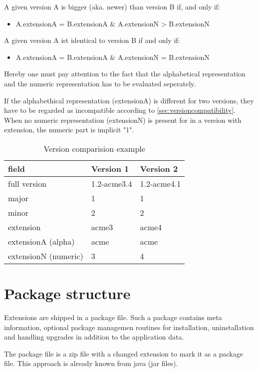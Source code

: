 A given version A is bigger (aka. newer) than version B if, and only if:
\begin{itemize}
\item A.extensionA = B.extensionA \& A.extensionN > B.extensionN
\end{itemize}

A given version A ist identical to version B if and only if:
\begin{itemize}
\item A.extensionA = B.extensionA \& A.extensionN = B.extensionN
\end{itemize}

Hereby one must pay attention to the fact that the alphabetical representation and the numeric representation has to be evaluated seperately.

If the alphabethical representation (extensionA) is different for two versions, they have to be regarded as incompatible according to \ref{sec:versioncompatibility}. When no numeric representation (extensionN) is present for in a version with extension, the numeric part is implicit "1".

\small
\begin{longtable}{|p{}|p{}|p{}|}
\caption{Version comparision example} \\
\hline
\label{tab:versioncompareexamples}
\textbf{field} & \textbf{Version 1} & \textbf{Version 2} \\
\hline
full version & 1.2-acme3.4 & 1.2-acme4.1
\\ \hline
major & 1 & 1
\\ \hline
minor & 2 & 2
\\ \hline
extension & acme3 & acme4
\\ \hline
extensionA (alpha) & acme & acme
\\ \hline
extensionN (numeric) & 3 & 4
\\ \hline
\end{longtable}
\normalsize

\section[sec:packet structure]{Package structure}
Extensions are shipped in a package file. Such a package contains meta information, optional package managemen routines for installation, uninstallation and handling upgrades in addition to the application data.

The package file is a zip file with a changed extension to mark it as a package file. This approach is already known \ie from java (jar files).

